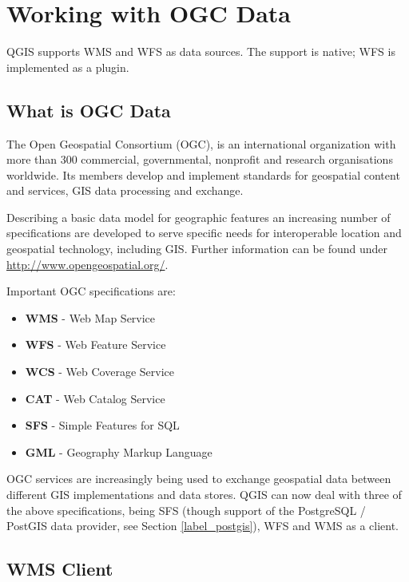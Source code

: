 \chapter{Working with OGC Data}


QGIS supports WMS and WFS as data sources. The support is native; WFS is
implemented as a plugin.

\section{What is OGC Data}

The Open Geospatial Consortium (OGC), is an international organization with more than 300 
commercial, governmental, nonprofit and research organisations worldwide. Its members 
develop and implement standards for geospatial content and services, GIS data processing 
and exchange.

Describing a basic data model for geographic features an increasing number of specifications 
are developed to serve specific needs for interoperable location and geospatial technology, 
including GIS. Further information can be found under \url{http://www.opengeospatial.org/}.

Important OGC specifications are:

\begin{itemize}[label=--]
\item \textbf{WMS} - Web Map Service
\item \textbf{WFS} - Web Feature Service
\item \textbf{WCS} - Web Coverage Service
\item \textbf{CAT} - Web Catalog Service
\item \textbf{SFS} - Simple Features for SQL
\item \textbf{GML} - Geography Markup Language
\end{itemize}

OGC services are increasingly being used to exchange geospatial data between
different GIS implementations and data stores.  QGIS can now deal with three of the
above specifications, being SFS (though support of the PostgreSQL / PostGIS
data provider, see Section \ref{label_postgis}), WFS and WMS as a client.

\section{WMS Client}\label{sec:ogc-wms}

